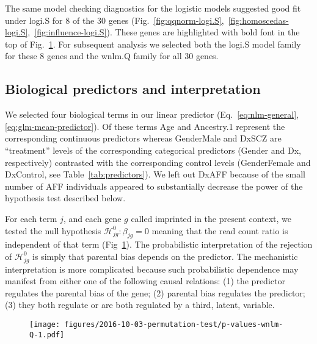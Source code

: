\documentclass[letterpaper]{article}
\begin{document}
The same model checking diagnostics for the logistic models suggested good
fit under logi.S for 8 of the 30 genes
(Fig.~\ref{fig:qqnorm-logi.S},~\ref{fig:homoscedas-logi.S},~\ref{fig:influence-logi.S}).
These genes are highlighted with bold font in the top of Fig.~\ref{fig:pval-wnlm.Q}.
For subsequent analysis we selected both the logi.S model family for these 8
genes and the wnlm.Q family for all 30 genes.

\subsection{Biological predictors and interpretation}

We selected four biological terms in our linear predictor
(Eq.~\ref{eq:nlm-general}, \ref{eq:glm-mean-predictor}).  Of these terms Age
and Ancestry.1 represent the corresponding continuous predictors whereas
GenderMale and DxSCZ are “treatment” levels of the corresponding categorical
predictors (Gender and Dx, respectively) contrasted with the corresponding
control levels (GenderFemale and DxControl, see Table~\ref{tab:predictors}).
We left out DxAFF because of the small number of AFF individuals appeared to
substantially decrease the power of the hypothesis test described below.

For each term \(j\), and each gene \(g\) called imprinted in the present
context, we tested the null hypothesis \(\mathcal{H}^0_{jg} : \beta_{jg} = 0\)
meaning that the read count ratio is independent of that term
(Fig~\ref{fig:pval-wnlm.Q}).  The probabilistic interpretation of the
rejection of \(\mathcal{H}^0_{jg}\) is simply that parental bias depends on
the predictor.  The mechanistic interpretation is more complicated because
such probabilistic dependence may manifest from either one of the following
causal relations: (1) the predictor regulates the parental bias of the gene;
(2) parental bias regulates the predictor; (3) they both regulate or are both
regulated by a third, latent, variable.

\begin{figure}
\begin{center}
\texttt{[image: figures/2016-10-03-permutation-test/p-values-wnlm-Q-1.pdf]}
\end{center}
\caption{}
\label{fig:pval-wnlm.Q}
\end{figure}
\end{document}
